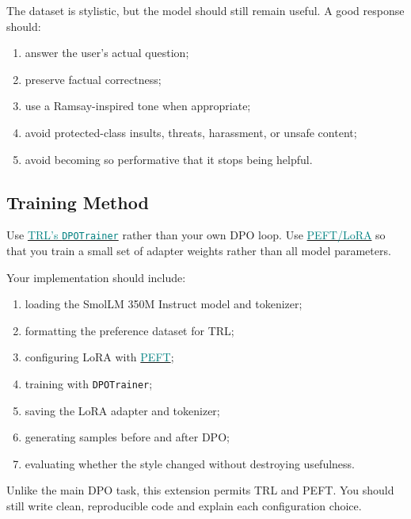 \documentclass[11pt]{article}
\newcommand{\resource}[2]{\href{#2}{\textcolor{Teal}{#1}}}
\begin{document}
The dataset is stylistic, but the model should still remain useful. A good response should:
\begin{enumerate}[leftmargin=*]
  \item answer the user's actual question;
  \item preserve factual correctness;
  \item use a Ramsay-inspired tone when appropriate;
  \item avoid protected-class insults, threats, harassment, or unsafe content;
  \item avoid becoming so performative that it stops being helpful.
\end{enumerate}

\subsection{Training Method}
Use \resource{TRL's \texttt{DPOTrainer}}{https://huggingface.co/docs/trl/en/dpo_trainer} rather than your own DPO loop. Use \resource{PEFT/LoRA}{https://huggingface.co/docs/peft/index} so that you train a small set of adapter weights rather than all model parameters.

Your implementation should include:
\begin{enumerate}[leftmargin=*]
  \item loading the SmolLM 350M Instruct model and tokenizer;
  \item formatting the preference dataset for TRL;
  \item configuring LoRA with \resource{PEFT}{https://huggingface.co/docs/peft/index};
  \item training with \texttt{DPOTrainer};
  \item saving the LoRA adapter and tokenizer;
  \item generating samples before and after DPO;
  \item evaluating whether the style changed without destroying usefulness.
\end{enumerate}

Unlike the main DPO task, this extension permits TRL and PEFT. You should still write clean, reproducible code and explain each configuration choice.
\end{document}

